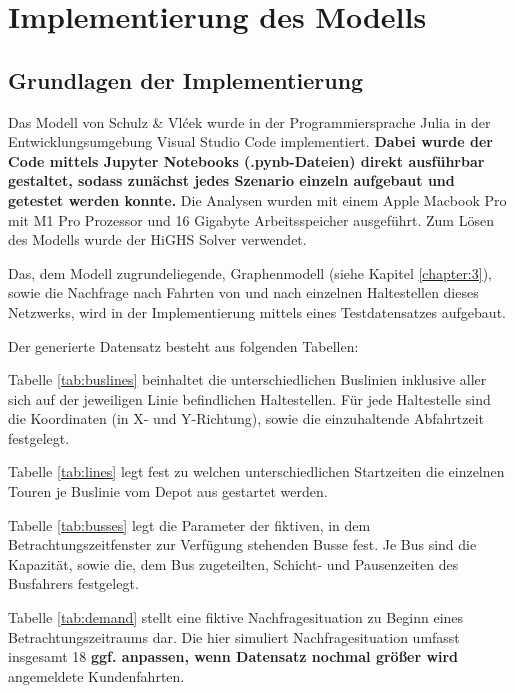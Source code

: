 \chapter{Implementierung des Modells}
\label{chapter:5}
\section{Grundlagen der Implementierung}
Das Modell von Schulz \& Vlćek wurde in der Programmiersprache Julia in der Entwicklungsumgebung Visual Studio Code implementiert. \textbf{Dabei wurde der Code mittels Jupyter Notebooks (.pynb-Dateien) direkt ausführbar gestaltet, sodass zunächst jedes Szenario einzeln aufgebaut und getestet werden konnte.} Die Analysen wurden mit einem Apple Macbook Pro mit M1 Pro Prozessor und 16 Gigabyte Arbeitsspeicher ausgeführt. Zum Lösen des Modells wurde der HiGHS Solver verwendet. 

Das, dem Modell zugrundeliegende, Graphenmodell (siehe Kapitel \ref{chapter:3}), sowie die Nachfrage nach Fahrten von und nach einzelnen Haltestellen dieses Netzwerks, wird in der Implementierung mittels eines Testdatensatzes aufgebaut. %

Der generierte Datensatz besteht aus folgenden Tabellen:

Tabelle \ref{tab:buslines} beinhaltet die unterschiedlichen Buslinien inklusive aller sich auf der jeweiligen Linie befindlichen Haltestellen. Für jede Haltestelle sind die Koordinaten (in X- und Y-Richtung), sowie die einzuhaltende Abfahrtzeit festgelegt. 

Tabelle \ref{tab:lines} legt fest zu welchen unterschiedlichen Startzeiten die einzelnen Touren je Buslinie vom Depot aus gestartet werden. 

Tabelle \ref{tab:busses} legt die Parameter der fiktiven, in dem Betrachtungszeitfenster zur Verfügung stehenden Busse fest. Je Bus sind die Kapazität, sowie die, dem Bus zugeteilten, Schicht- und Pausenzeiten des Busfahrers festgelegt.

Tabelle \ref{tab:demand} stellt eine fiktive Nachfragesituation zu Beginn eines Betrachtungszeitraums dar. Die hier simuliert Nachfragesituation umfasst insgesamt 18 \textbf{ggf. anpassen, wenn Datensatz nochmal größer wird} angemeldete Kundenfahrten. 

